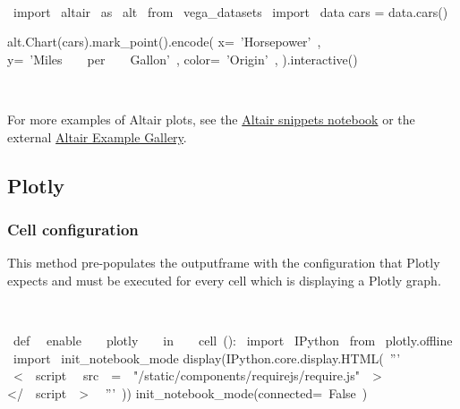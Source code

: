 \begin{paracol}{2}
\smallskip
\begin{cellExecute}[escapechar=~]
~~
\end{cellExecute}
\switchcolumn
\begin{codeCell}[escapechar=~]
~\textcolor{mtk17}{import}~ altair ~\textcolor{mtk17}{as}~ alt
~\textcolor{mtk17}{from}~ vega_datasets ~\textcolor{mtk17}{import}~ data
cars = data.cars()

alt.Chart(cars).mark_point().encode(
    x=~\textcolor{mtk25}{'Horsepower'}~,
    y=~\textcolor{mtk25}{'Miles}~~~~\textcolor{mtk25}{per}~~~~\textcolor{mtk25}{Gallon'}~,
    color=~\textcolor{mtk25}{'Origin'}~,
).interactive()
\end{codeCell}
\end{paracol}

\begin{paracol}{2}
\begin{cellExecute}[escapechar=~]
~~
\end{cellExecute}
\switchcolumn
\begin{resultCell}[escapechar=~]
\end{resultCell}
\end{paracol}
For more examples of Altair plots, see the \href{/notebooks/snippets/altair.ipynb}{Altair snippets notebook} or the external \href{https://altair-viz.github.io/gallery/}{Altair Example Gallery}.\\
\subsection{Plotly}
\subsubsection{Cell configuration}
This method pre-populates the outputframe with the configuration that Plotly expects and must be executed for every cell which is displaying a Plotly graph.\\

\begin{paracol}{2}
\smallskip
\begin{cellExecute}[escapechar=~]
~~
\end{cellExecute}
\switchcolumn
\begin{codeCell}[escapechar=~]
~\textcolor{mtk6}{def}~ ~\textcolor{mtk13}{enable}~~~~\textcolor{mtk13}{plotly}~~~~\textcolor{mtk13}{in}~~~~\textcolor{mtk13}{cell}~():
  ~\textcolor{mtk17}{import}~ IPython
  ~\textcolor{mtk17}{from}~ plotly.offline ~\textcolor{mtk17}{import}~ init_notebook_mode
  display(IPython.core.display.HTML(~\textcolor{mtk25}{'''}~
        ~\textcolor{mtk11}{<}~~\textcolor{mtk19}{script}~ ~\textcolor{mtk4}{src}~~\textcolor{mtk11}{=}~~\textcolor{mtk6}{"/static/components/requirejs/require.js"}~~\textcolor{mtk11}{></}~~\textcolor{mtk19}{script}~~\textcolor{mtk11}{>}~
  ~\textcolor{mtk25}{'''}~))
  init_notebook_mode(connected=~\textcolor{mtk6}{False}~)
\end{codeCell}
\end{paracol}
